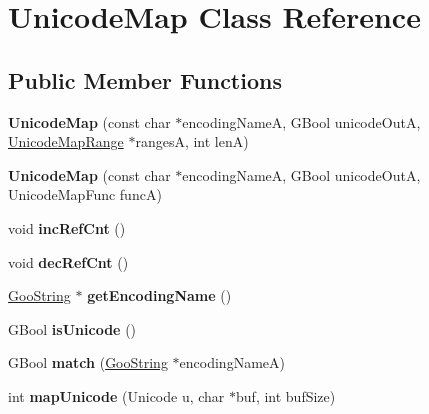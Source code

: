 \hypertarget{class_unicode_map}{}\section{Unicode\+Map Class Reference}
\label{class_unicode_map}
\subsection*{Public Member Functions}
\begin{DoxyCompactItemize}
\item 
\mbox{\label{class_unicode_map_afe23ad97167531922f8a8ce497550d43}} 
{\bfseries Unicode\+Map} (const char $\ast$encoding\+NameA, G\+Bool unicode\+OutA, \hyperlink{struct_unicode_map_range}{Unicode\+Map\+Range} $\ast$rangesA, int lenA)
\item 
\mbox{\label{class_unicode_map_a38f855de220e8c4511aff933073c0d1a}} 
{\bfseries Unicode\+Map} (const char $\ast$encoding\+NameA, G\+Bool unicode\+OutA, Unicode\+Map\+Func funcA)
\item 
\mbox{\label{class_unicode_map_a584977a5e59a76e1b3a938b4aa544c62}} 
void {\bfseries inc\+Ref\+Cnt} ()
\item 
\mbox{\label{class_unicode_map_ace3a73e87da7111e0a714b5ca49ce95c}} 
void {\bfseries dec\+Ref\+Cnt} ()
\item 
\mbox{\label{class_unicode_map_ad69fe5b69264f8110f8f7cf01edbd120}} 
\hyperlink{class_goo_string}{Goo\+String} $\ast$ {\bfseries get\+Encoding\+Name} ()
\item 
\mbox{\label{class_unicode_map_a902fdfda802e7e505f66fa7109d40e04}} 
G\+Bool {\bfseries is\+Unicode} ()
\item 
\mbox{\label{class_unicode_map_a0086ae0b58e759e358076e1adf1e3836}} 
G\+Bool {\bfseries match} (\hyperlink{class_goo_string}{Goo\+String} $\ast$encoding\+NameA)
\item 
\mbox{\label{class_unicode_map_a6b72f58c5f5faa5594a35f14200ac184}} 
int {\bfseries map\+Unicode} (Unicode u, char $\ast$buf, int buf\+Size)
\end{DoxyCompactItemize}
